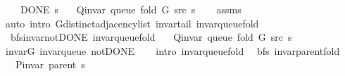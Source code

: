 \begin{isabellebody}
\ \ \ {\isachardoublequoteopen}{\isasymnot}\ DONE\ s{\isachardoublequoteclose}\isanewline
\ \ \ {\isachardoublequoteopen}Q{\isacharunderscore}{\kern0pt}invar\ {\isacharparenleft}{\kern0pt}queue\ {\isacharparenleft}{\kern0pt}fold\ G\ src\ s{\isacharparenright}{\kern0pt}{\isacharparenright}{\kern0pt}{\isachardoublequoteclose}%
\endisataginvisible
{\isafoldinvisible}%
%
\isadeliminvisible
\isanewline
%
\endisadeliminvisible
%
\isadelimproof
\ \ %
\endisadelimproof
%
\isatagproof
{}\isamarkupfalse%
\ assms\isanewline
\ \ \isamarkupfalse%
\ {\isacharparenleft}{\kern0pt}auto\ intro{\isacharcolon}{\kern0pt}\ G{\isachardot}{\kern0pt}distinct{\isacharunderscore}{\kern0pt}adjacency{\isacharunderscore}{\kern0pt}list\ invar{\isacharunderscore}{\kern0pt}tail\ invar{\isacharunderscore}{\kern0pt}queue{\isacharunderscore}{\kern0pt}fold{\isacharparenright}{\kern0pt}%
\endisatagproof
{\isafoldproof}%
%
\isadelimproof
\isanewline
%
\endisadelimproof
\isanewline
{}\isamarkupfalse%
\ {\isacharparenleft}{\kern0pt}\ bfs{\isacharunderscore}{\kern0pt}invar{\isacharunderscore}{\kern0pt}not{\isacharunderscore}{\kern0pt}DONE{\isacharparenright}{\kern0pt}\ invar{\isacharunderscore}{\kern0pt}queue{\isacharunderscore}{\kern0pt}fold{\isacharcolon}{\kern0pt}\isanewline
\ \ \ {\isachardoublequoteopen}Q{\isacharunderscore}{\kern0pt}invar\ {\isacharparenleft}{\kern0pt}queue\ {\isacharparenleft}{\kern0pt}fold\ G\ src\ s{\isacharparenright}{\kern0pt}{\isacharparenright}{\kern0pt}{\isachardoublequoteclose}\isanewline
%
\isadelimproof
\ \ %
\endisadelimproof
%
\isatagproof
{}\isamarkupfalse%
\ invar{\isacharunderscore}{\kern0pt}G\ invar{\isacharunderscore}{\kern0pt}queue\ not{\isacharunderscore}{\kern0pt}DONE\isanewline
\ \ \isamarkupfalse%
\ {\isacharparenleft}{\kern0pt}intro\ invar{\isacharunderscore}{\kern0pt}queue{\isacharunderscore}{\kern0pt}fold{\isacharunderscore}{\kern0pt}{}{\isacharparenright}{\kern0pt}%
\endisatagproof
{\isafoldproof}%
%
\isadelimproof
\isanewline
%
\endisadelimproof
%
\isadeliminvisible
\isanewline
%
\endisadeliminvisible
%
\isataginvisible
{}\isamarkupfalse%
\ {\isacharparenleft}{\kern0pt}\ bfs{\isacharparenright}{\kern0pt}\ invar{\isacharunderscore}{\kern0pt}parent{\isacharunderscore}{\kern0pt}fold{\isacharcolon}{\kern0pt}\isanewline
\ \ \ {\isachardoublequoteopen}P{\isacharunderscore}{\kern0pt}invar\ {\isacharparenleft}{\kern0pt}parent\ s{\isacharparenright}{\kern0pt}{\isachardoublequoteclose}\isanewline

\end{isabellebody}
